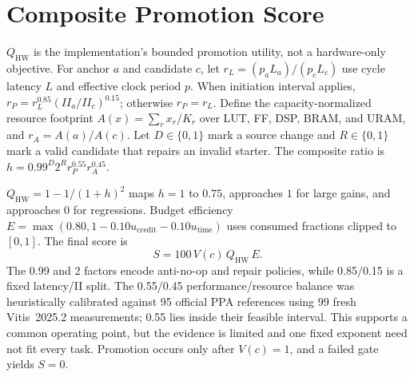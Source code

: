 \section{Composite Promotion Score}

$Q_{\mathrm{HW}}$ is the implementation's bounded promotion utility, not a
hardware-only objective. For anchor $a$ and candidate $c$, let
$r_L=(p_aL_a)/(p_cL_c)$ use cycle latency $L$ and effective clock period $p$.
When initiation interval applies,
$r_P=r_L^{0.85}(II_a/II_c)^{0.15}$; otherwise $r_P=r_L$. Define the
capacity-normalized resource footprint
$A(x)=\sum_r x_r/K_r$ over LUT, FF, DSP, BRAM, and URAM, and
$r_A=A(a)/A(c)$. Let $D\in\{0,1\}$ mark a source change and
$R\in\{0,1\}$ mark a valid candidate that repairs an invalid starter. The
composite ratio is
$h=0.99^D2^Rr_P^{0.55}r_A^{0.45}$.

$Q_{\mathrm{HW}}=1-1/(1+h)^2$ maps $h{=}1$ to $0.75$, approaches $1$ for
large gains, and approaches $0$ for regressions. Budget efficiency
$E=\max(0.80,1-0.10u_{\mathrm{credit}}-0.10u_{\mathrm{time}})$ uses consumed
fractions clipped to $[0,1]$. The final score is
\begin{equation}
S=100\,V(c)\,Q_{\mathrm{HW}}\,E.
\label{eq:score}
\end{equation}
The 0.99 and 2 factors encode anti-no-op and repair policies, while 0.85/0.15
is a fixed latency/II split. The 0.55/0.45 performance/resource balance was
heuristically calibrated against 95 official PPA references using 99 fresh
Vitis~2025.2 measurements; 0.55 lies inside their feasible interval. This
supports a common operating point, but the evidence is limited and one fixed
exponent need not fit every task. Promotion occurs only after $V(c){=}1$, and
a failed gate yields $S{=}0$.

